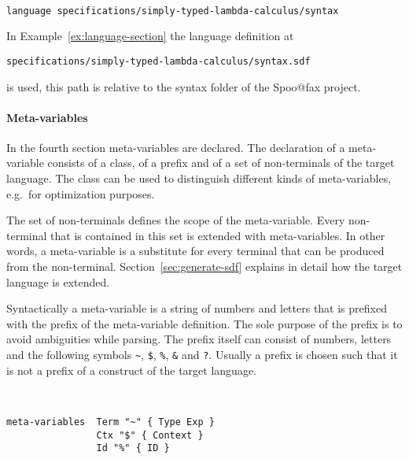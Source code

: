 \begin{example}{~}
\begin{lstlisting}[language=sltc]
language specifications/simply-typed-lambda-calculus/syntax
\end{lstlisting}
\label{ex:language-section}
\end{example}

In Example~\ref{ex:language-section} the language definition at
\begin{lstlisting}[language=sltc]
specifications/simply-typed-lambda-calculus/syntax.sdf
\end{lstlisting}

is used, this path is relative to the syntax folder of the Spoo@fax
project.

\paragraph{Meta-variables} In the fourth section meta-variables are
declared. The declaration of a meta-variable consists of a class, of a
prefix and of a set of non-terminals of the target language. The class
can be used to distinguish different kinds of meta-variables, e.g.\
for optimization purposes. 

The set of non-terminals defines the scope of the meta-variable. Every
non-terminal that is contained in this set is extended with
meta-variables. In other words, a meta-variable is a substitute for
every terminal that can be produced from the
non-terminal. Section~\ref{sec:generate-sdf} explains in detail how
the target language is extended.

Syntactically a meta-variable is a string of numbers and letters that
is prefixed with the prefix of the meta-variable definition. The sole
purpose of the prefix is to avoid ambiguities while parsing. The
prefix itself can consist of numbers, letters and the following
symbols \verb|~|, \verb|$|, \verb|%|, \verb|&| and \verb|?|.
 Usually a prefix is chosen such that it
is not a prefix of a construct of the target language.

\begin{example}{~}
\begin{lstlisting}[language=sltc]
meta-variables 	Term "~" { Type Exp }
                Ctx "$" { Context }
                Id "%" { ID }
\end{lstlisting}
\label{ex:meta-variable-section}
\end{example}

